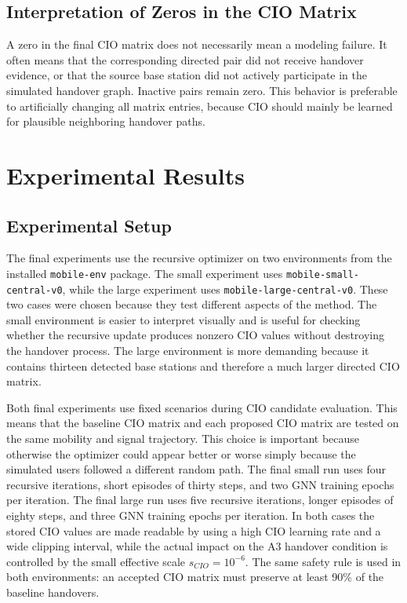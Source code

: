 \documentclass[11pt,a4paper]{article}
\begin{document}
\subsection{Interpretation of Zeros in the CIO Matrix}
A zero in the final CIO matrix does not necessarily mean a modeling failure. It often means that the corresponding directed pair did not receive handover evidence, or that the source base station did not actively participate in the simulated handover graph. Inactive pairs remain zero. This behavior is preferable to artificially changing all matrix entries, because CIO should mainly be learned for plausible neighboring handover paths.

\section{Experimental Results}
\label{sec:experiments}

\subsection{Experimental Setup}
The final experiments use the recursive optimizer on two environments from the installed \texttt{mobile-env} package. The small experiment uses \texttt{mobile-small-central-v0}, while the large experiment uses \texttt{mobile-large-central-v0}. These two cases were chosen because they test different aspects of the method. The small environment is easier to interpret visually and is useful for checking whether the recursive update produces nonzero CIO values without destroying the handover process. The large environment is more demanding because it contains thirteen detected base stations and therefore a much larger directed CIO matrix.

Both final experiments use fixed scenarios during CIO candidate evaluation. This means that the baseline CIO matrix and each proposed CIO matrix are tested on the same mobility and signal trajectory. This choice is important because otherwise the optimizer could appear better or worse simply because the simulated users followed a different random path. The final small run uses four recursive iterations, short episodes of thirty steps, and two GNN training epochs per iteration. The final large run uses five recursive iterations, longer episodes of eighty steps, and three GNN training epochs per iteration. In both cases the stored CIO values are made readable by using a high CIO learning rate and a wide clipping interval, while the actual impact on the A3 handover condition is controlled by the small effective scale $s_{CIO}=10^{-6}$. The same safety rule is used in both environments: an accepted CIO matrix must preserve at least 90\% of the baseline handovers.
\end{document}
